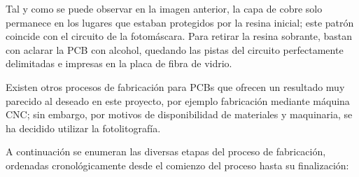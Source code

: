\begin{itemize}
    Tal y como se puede observar en la imagen anterior, la capa de cobre solo permanece en los lugares que estaban protegidos por la resina inicial; este patrón coincide con el circuito de la fotomáscara. Para retirar la resina sobrante, bastan con aclarar la PCB con alcohol, quedando las pistas del circuito perfectamente delimitadas e impresas en la placa de fibra de vidrio.
    
\end{itemize}

Existen otros procesos de fabricación para PCBs que ofrecen un resultado muy parecido al deseado en este proyecto, por ejemplo fabricación mediante máquina CNC; sin embargo, por motivos de disponibilidad de materiales y maquinaria, se ha decidido utilizar la fotolitografía.

A continuación se enumeran las diversas etapas del proceso de fabricación, ordenadas cronológicamente desde el comienzo del proceso hasta su finalización:

